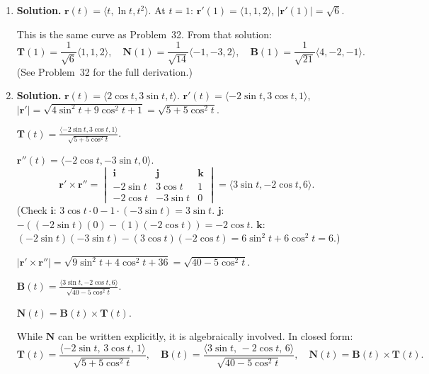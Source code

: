 \begin{enumerate}
$\mathbf{k}$: $(1/2)(-1/4)-(1/2)(-1/4)=-1/8+1/8=0$.

So $\mathbf{r}'\times\mathbf{r}''=\langle 3/2, -3/2, 0\rangle$, $|\mathbf{r}'\times\mathbf{r}''|=\frac{3}{2}\sqrt{2}=\frac{3\sqrt{2}}{2}$.
\[
\kappa(1)=\frac{3\sqrt{2}/2}{(3/\sqrt{2})^3}=\frac{3\sqrt{2}/2}{27/(2\sqrt{2})}=\frac{3\sqrt{2}}{2}\cdot\frac{2\sqrt{2}}{27}=\frac{12}{54}=\frac{2}{9}.
\]
\[
\boxed{\kappa(1)=\frac{2}{9}.}
\]


\item \textbf{Solution.}
$\mathbf{r}(t)=\langle t, \ln t, t^2\rangle$. At $t=1$: $\mathbf{r}'(1)=\langle 1,1,2\rangle$, $|\mathbf{r}'(1)|=\sqrt{6}$.

This is the same curve as Problem~32. From that solution:
\[
\boxed{\mathbf{T}(1)=\frac{1}{\sqrt{6}}\langle 1,1,2\rangle,\quad \mathbf{N}(1)=\frac{1}{\sqrt{14}}\langle -1,-3,2\rangle,\quad \mathbf{B}(1)=\frac{1}{\sqrt{21}}\langle 4,-2,-1\rangle.}
\]
(See Problem~32 for the full derivation.)

\item \textbf{Solution.}
$\mathbf{r}(t)=\langle 2\cos t, 3\sin t, t\rangle$.
$\mathbf{r}'(t)=\langle -2\sin t, 3\cos t, 1\rangle$, $|\mathbf{r}'|=\sqrt{4\sin^2 t+9\cos^2 t+1}=\sqrt{5+5\cos^2 t}$.

$\mathbf{T}(t)=\frac{\langle -2\sin t, 3\cos t, 1\rangle}{\sqrt{5+5\cos^2 t}}$.

$\mathbf{r}''(t)=\langle -2\cos t, -3\sin t, 0\rangle$.
\[
\mathbf{r}'\times\mathbf{r}''=\begin{vmatrix}\mathbf{i}&\mathbf{j}&\mathbf{k}\\-2\sin t&3\cos t&1\\-2\cos t&-3\sin t&0\end{vmatrix}=\langle 3\sin t, -2\cos t, 6\rangle.
\]
(Check $\mathbf{i}$: $3\cos t\cdot 0 - 1\cdot(-3\sin t)=3\sin t$. $\mathbf{j}$: $-((-2\sin t)(0)-(1)(-2\cos t))=-2\cos t$. $\mathbf{k}$: $(-2\sin t)(-3\sin t)-(3\cos t)(-2\cos t)=6\sin^2 t+6\cos^2 t=6$.)

$|\mathbf{r}'\times\mathbf{r}''|=\sqrt{9\sin^2 t+4\cos^2 t+36}=\sqrt{40-5\cos^2 t}$.

$\mathbf{B}(t)=\frac{\langle 3\sin t, -2\cos t, 6\rangle}{\sqrt{40-5\cos^2 t}}$.

$\mathbf{N}(t)=\mathbf{B}(t)\times\mathbf{T}(t)$.

While $\mathbf{N}$ can be written explicitly, it is algebraically involved. In closed form:
\[
\boxed{\mathbf{T}(t)=\frac{\langle -2\sin t,\, 3\cos t,\, 1\rangle}{\sqrt{5+5\cos^2 t}},\quad \mathbf{B}(t)=\frac{\langle 3\sin t,\, -2\cos t,\, 6\rangle}{\sqrt{40-5\cos^2 t}},\quad \mathbf{N}(t)=\mathbf{B}(t)\times\mathbf{T}(t).}
\]


\end{enumerate}

